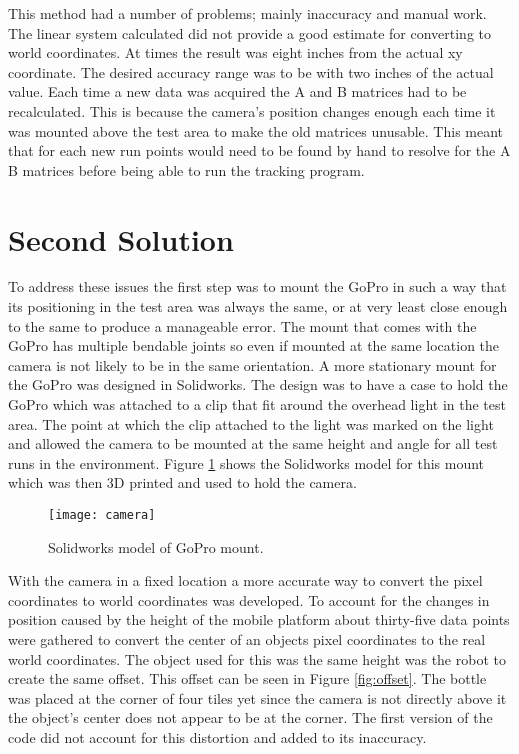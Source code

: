 This method had a number of problems; mainly inaccuracy and manual work. The linear system calculated did not provide a good estimate for converting to world coordinates. At times the result was eight inches from the actual xy coordinate. The desired accuracy range was to be with two inches of the actual value. Each time a new data was acquired the A and B matrices had to be recalculated. This is because the camera's position changes enough each time it was mounted above the test area to make the old matrices unusable. This meant that for each new run points would need to be found by hand to resolve for the A B matrices before being able to run the tracking program.

\section{Second Solution}

To address these issues the first step was to mount the GoPro in such a way that its positioning in the test area was always the same, or at very least close enough to the same to produce a manageable error. The mount that comes with the GoPro has multiple bendable joints so even if mounted at the same location the camera is not likely to be in the same orientation. A more stationary mount for the GoPro was designed in Solidworks. The design was to have a case to hold the GoPro which was attached to a clip that fit around the overhead light in the test area. The point at which the clip attached to the light was marked on the light and allowed the camera to be mounted at the same height and angle for all test runs in the environment. Figure \ref{fig:mount} shows the Solidworks model for this mount which was then 3D printed and used to hold the camera.

\begin{figure}[h]
\centering
\texttt{[image: camera]}
\caption{Solidworks model of GoPro mount.}
\label{fig:mount}
\end{figure}

With the camera in a fixed location a more accurate way to convert the pixel coordinates to world coordinates was developed. To account for the changes in position caused by the height of the mobile platform about thirty-five data points were gathered to convert the center of an objects pixel coordinates to the real world coordinates. The object used for this was the same height was the robot to create the same offset. This offset can be seen in Figure \ref{fig:offset}. The bottle was placed at the corner of four tiles yet since the camera is not directly above it the object's center does not appear to be at the corner. The first version of the code did not account for this distortion and added to its inaccuracy. 

